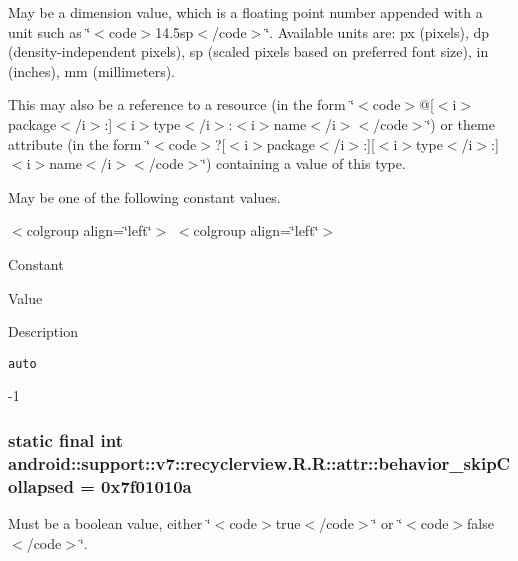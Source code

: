 May be a dimension value, which is a floating point number appended with a unit such as \char`\"{}$<$code$>$14.5sp$<$/code$>$\char`\"{}. Available units are: px (pixels), dp (density-independent pixels), sp (scaled pixels based on preferred font size), in (inches), mm (millimeters). 

This may also be a reference to a resource (in the form \char`\"{}$<$code$>$@\mbox{[}$<$i$>$package$<$/i$>$:\mbox{]}$<$i$>$type$<$/i$>$:$<$i$>$name$<$/i$>$$<$/code$>$\char`\"{}) or theme attribute (in the form \char`\"{}$<$code$>$?\mbox{[}$<$i$>$package$<$/i$>$:\mbox{]}\mbox{[}$<$i$>$type$<$/i$>$:\mbox{]}$<$i$>$name$<$/i$>$$<$/code$>$\char`\"{}) containing a value of this type. 

May be one of the following constant values. \begin{TabularC}{0}
\hline
\end{TabularC}
$<$colgroup align=\char`\"{}left\char`\"{}$>$ $<$colgroup align=\char`\"{}left\char`\"{}$>$ 

Constant

Value

Description 

{\tt auto}

-1\hypertarget{classandroid_1_1support_1_1v7_1_1recyclerview_1_1_r_1_1attr_23a6de30b72075d25050941ed875f566}{
\subsubsection[{behavior\_\-skipCollapsed}]{\setlength{\rightskip}{0pt plus 5cm}static final int android::support::v7::recyclerview.R.R::attr::behavior\_\-skipCollapsed = 0x7f01010a}}
\label{classandroid_1_1support_1_1v7_1_1recyclerview_1_1_r_1_1attr_23a6de30b72075d25050941ed875f566}


Must be a boolean value, either \char`\"{}$<$code$>$true$<$/code$>$\char`\"{} or \char`\"{}$<$code$>$false$<$/code$>$\char`\"{}. 

